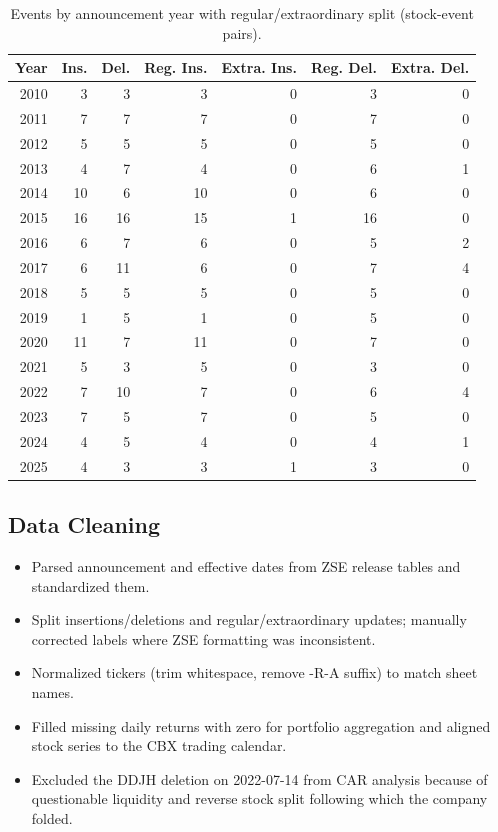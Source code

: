 \documentclass{article}
\begin{document}
\begin{table}[htbp]
\centering
\caption{Events by announcement year with regular/extraordinary split (stock-event pairs).}
\label{tab:events_by_year}
\scriptsize
\begin{tabular}{rrrrrrr}
\toprule
Year & Ins. & Del. & Reg. Ins. & Extra. Ins. & Reg. Del. & Extra. Del. \\
\midrule
2010 & 3 & 3 & 3 & 0 & 3 & 0 \\
2011 & 7 & 7 & 7 & 0 & 7 & 0 \\
2012 & 5 & 5 & 5 & 0 & 5 & 0 \\
2013 & 4 & 7 & 4 & 0 & 6 & 1 \\
2014 & 10 & 6 & 10 & 0 & 6 & 0 \\
2015 & 16 & 16 & 15 & 1 & 16 & 0 \\
2016 & 6 & 7 & 6 & 0 & 5 & 2 \\
2017 & 6 & 11 & 6 & 0 & 7 & 4 \\
2018 & 5 & 5 & 5 & 0 & 5 & 0 \\
2019 & 1 & 5 & 1 & 0 & 5 & 0 \\
2020 & 11 & 7 & 11 & 0 & 7 & 0 \\
2021 & 5 & 3 & 5 & 0 & 3 & 0 \\
2022 & 7 & 10 & 7 & 0 & 6 & 4 \\
2023 & 7 & 5 & 7 & 0 & 5 & 0 \\
2024 & 4 & 5 & 4 & 0 & 4 & 1 \\
2025 & 4 & 3 & 3 & 1 & 3 & 0 \\
\bottomrule
\end{tabular}
\end{table}

\subsection{Data Cleaning}
\begin{itemize}
\item Parsed announcement and effective dates from ZSE release tables and standardized them.
\item Split insertions/deletions and regular/extraordinary updates; manually corrected labels where ZSE formatting was inconsistent.
\item Normalized tickers (trim whitespace, remove -R-A suffix) to match sheet names.
\item Filled missing daily returns with zero for portfolio aggregation and aligned stock series to the CBX trading calendar.
\item Excluded the DDJH deletion on 2022-07-14 from CAR analysis because of questionable liquidity and reverse stock split following which the company folded.
\end{itemize}
\end{document}
